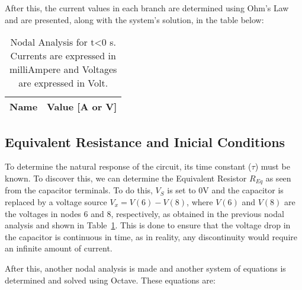 After this, the current values in each branch are determined using Ohm's Law and are presented, along with the system's solution, in the table below:

\begin{table}[h]
  \centering
  \begin{tabular}{|l|r|}
    \hline
    {\bf Name} & {\bf Value [A or V]} \\ \hline
    
  \end{tabular}
  \caption{Nodal Analysis for t<0 s. Currents are expressed in milliAmpere and Voltages are expressed in Volt.}                                                            
  \label{tab:theoretical1}                                                      
\end{table}   


\subsection{Equivalent Resistance and Inicial Conditions}

To determine the natural response of the circuit, its time constant ($\tau$) must be known. To discover this, we can determine the Equivalent Resistor $R_{Eq}$ as seen from the capacitor terminals. To do this, $V_{S}$ is set to 0V and the capacitor is replaced by a voltage source $V_{x} = V(6) - V(8)$, where $V(6)$ and $V(8)$ are the voltages in nodes 6 and 8, respectively, as obtained in the previous nodal analysis and shown in Table~\ref{tab:theoretical1}. This is done to ensure that the voltage drop in the capacitor is continuous in time, as in reality, any discontinuity would require an infinite amount of current. 

After this, another nodal analysis is made and another system of equations is determined and solved using Octave. These equations are:

